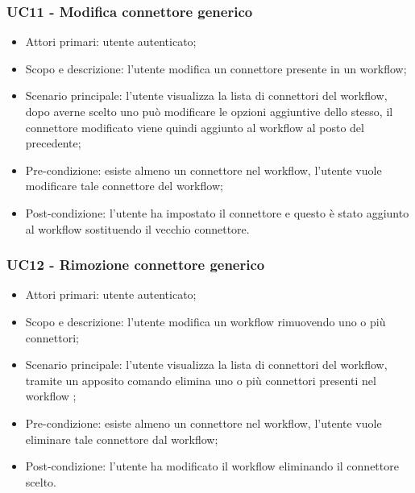 \subsubsection{UC11 - Modifica connettore generico}
\begin{itemize}
	\item  Attori primari: utente autenticato;
	\item  Scopo e descrizione: l'utente modifica un connettore presente in un workflow;
	\item  Scenario principale: l'utente visualizza la lista di connettori del workflow, dopo averne scelto uno può modificare le opzioni aggiuntive dello stesso, il connettore modificato viene quindi aggiunto al workflow al posto del precedente;
	\item  Pre-condizione: esiste almeno un connettore nel workflow, l'utente vuole modificare tale connettore del workflow;
	\item  Post-condizione: l'utente ha impostato il connettore e questo è stato aggiunto al workflow sostituendo il vecchio connettore.
\end{itemize}
\subsubsection{UC12 - Rimozione connettore generico}
\begin{itemize}
	\item  Attori primari: utente autenticato;
	\item  Scopo e descrizione: l'utente modifica un workflow rimuovendo uno o più connettori;
	\item  Scenario principale: l'utente visualizza la lista di connettori del workflow, tramite un apposito comando elimina uno o più connettori presenti nel workflow ;
	\item  Pre-condizione: esiste almeno un connettore nel workflow, l'utente vuole eliminare tale connettore dal workflow;
	\item  Post-condizione: l'utente ha modificato il workflow eliminando il connettore scelto.
\end{itemize}
